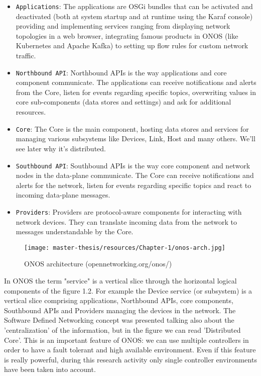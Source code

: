 \documentclass[a4paper,10pt]{memoir}
\begin{document}
\begin{itemize}
  \item \texttt{Applications}: The applications are OSGi bundles that can be activated and deactivated (both at system startup and at runtime using the Karaf console) providing and implementing services ranging from displaying network topologies in a web browser, integrating famous products in ONOS (like Kubernetes and Apache Kafka) to setting up flow rules for custom network traffic.
  \item \texttt{Northbound API}: Northbound APIs is the way applications and core component communicate. The applications can receive notifications and alerts from the Core, listen for events regarding specific topics, overwriting values in core sub-components (data stores and settings) and ask for additional resources.
  \item \texttt{Core}: The Core is the main component, hosting data stores and services for managing various subsystems like Devices, Link, Host and many others. We'll see later why it's distributed. 
  \item \texttt{Southbound API}: Southbound APIs is the way core component and network nodes in the data-plane communicate. The Core can receive notifications and alerts for the network, listen for events regarding specific topics and react to incoming data-plane messages.
  \item \texttt{Providers}: Providers are protocol-aware components for interacting with network devices. They can translate incoming data from the network to messages understandable by the Core. 
\end{itemize}

\begin{figure}[t]
\caption{ONOS architecture (opennetworking.org/onos/)}
\label{fig:onos-arch}
\texttt{[image: master-thesis/resources/Chapter-1/onos-arch.jpg]}
\centering
\end{figure}

In ONOS the term "service" is a vertical slice through the horizontal logical components of the figure 1.2. For example the Device service (or subsystem) is a vertical slice comprising applications, Northbound APIs, core components, Southbound APIs and Providers managing the devices in the network. The Software Defined Networking concept was presented talking also about the 'centralization' of the information, but in the figure we can read 'Distributed Core'. This is an important feature of ONOS: we can use multiple controllers in order to have a fault tolerant and high available environment. Even if this feature is really powerful, during this research activity only single controller environments have been taken into account. 
\end{document}
